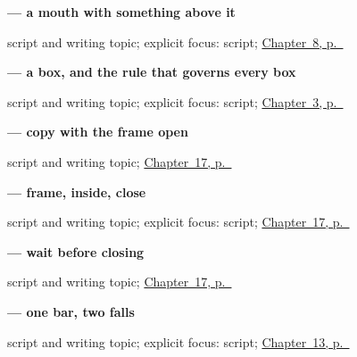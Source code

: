 \noindent\begin{minipage}[t]{\linewidth}
\raggedright
\textbf{ — a mouth with something above it}\par
\footnotesize script and writing topic; explicit focus: script; \hyperref[ch:zh-mingzi]{Chapter~8, p.~\pageref*{ch:zh-mingzi}}
\end{minipage}\par\smallskip

\noindent\begin{minipage}[t]{\linewidth}
\raggedright
\textbf{ — a box, and the rule that governs every box}\par
\footnotesize script and writing topic; explicit focus: script; \hyperref[ch:zh-numbers]{Chapter~3, p.~\pageref*{ch:zh-numbers}}
\end{minipage}\par\smallskip

\noindent\begin{minipage}[t]{\linewidth}
\raggedright
\textbf{ — copy with the frame open}\par
\footnotesize script and writing topic; \hyperref[ch:zh-language-country]{Chapter~17, p.~\pageref*{ch:zh-language-country}}
\end{minipage}\par\smallskip

\noindent\begin{minipage}[t]{\linewidth}
\raggedright
\textbf{ — frame, inside, close}\par
\footnotesize script and writing topic; explicit focus: script; \hyperref[ch:zh-language-country]{Chapter~17, p.~\pageref*{ch:zh-language-country}}
\end{minipage}\par\smallskip

\noindent\begin{minipage}[t]{\linewidth}
\raggedright
\textbf{ — wait before closing}\par
\footnotesize script and writing topic; \hyperref[ch:zh-language-country]{Chapter~17, p.~\pageref*{ch:zh-language-country}}
\end{minipage}\par\smallskip

\noindent\begin{minipage}[t]{\linewidth}
\raggedright
\textbf{ — one bar, two falls}\par
\footnotesize script and writing topic; explicit focus: script; \hyperref[ch:zh-school-six]{Chapter~13, p.~\pageref*{ch:zh-school-six}}
\end{minipage}\par\smallskip

